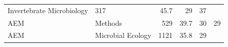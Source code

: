 \documentclass[11pt,]{article}
\begin{document}
\begin{longtable}[]{@{}llrrrr@{}}
\begin{minipage}[t]{0.43\columnwidth}
Invertebrate Microbiology\strut
\end{minipage} & \begin{minipage}[t]{0.04\columnwidth}\raggedleft\strut
317\strut
\end{minipage} & \begin{minipage}[t]{0.08\columnwidth}\raggedleft\strut
45.7\strut
\end{minipage} & \begin{minipage}[t]{0.11\columnwidth}\raggedleft\strut
29\strut
\end{minipage} & \begin{minipage}[t]{0.11\columnwidth}\raggedleft\strut
37\strut
\end{minipage}\tabularnewline
\begin{minipage}[t]{0.06\columnwidth}\raggedright\strut
AEM\strut
\end{minipage} & \begin{minipage}[t]{0.43\columnwidth}\raggedright\strut
Methods\strut
\end{minipage} & \begin{minipage}[t]{0.04\columnwidth}\raggedleft\strut
529\strut
\end{minipage} & \begin{minipage}[t]{0.08\columnwidth}\raggedleft\strut
39.7\strut
\end{minipage} & \begin{minipage}[t]{0.11\columnwidth}\raggedleft\strut
30\strut
\end{minipage} & \begin{minipage}[t]{0.11\columnwidth}\raggedleft\strut
29\strut
\end{minipage}\tabularnewline
\begin{minipage}[t]{0.06\columnwidth}\raggedright\strut
AEM\strut
\end{minipage} & \begin{minipage}[t]{0.43\columnwidth}\raggedright\strut
Microbial Ecology\strut
\end{minipage} & \begin{minipage}[t]{0.04\columnwidth}\raggedleft\strut
1121\strut
\end{minipage} & \begin{minipage}[t]{0.08\columnwidth}\raggedleft\strut
35.8\strut
\end{minipage} & \begin{minipage}[t]{0.11\columnwidth}\raggedleft\strut
29\strut
\end{minipage} & \begin{minipage}[t]{0.11\columnwidth}\raggedleft\strut

\end{minipage}
\end{longtable}
\end{document}
